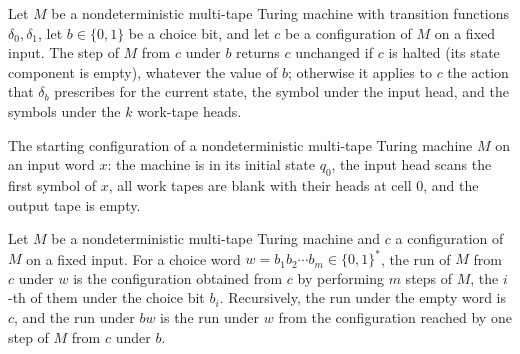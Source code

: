 \begin{definition}
\label{Turing.NDTM.stepWith}
\leanok
{}
Let $M$ be a nondeterministic multi-tape Turing machine with transition functions
$\delta_0, \delta_1$, let $b \in \{0,1\}$ be a choice bit, and let $c$ be a configuration
of $M$ on a fixed input.  The step of $M$ from $c$ under $b$ returns $c$ unchanged if $c$
is halted (its state component is empty), whatever the value of $b$; otherwise it applies
to $c$ the action that $\delta_b$ prescribes for the current state, the symbol under the
input head, and the symbols under the $k$ work-tape heads.
\end{definition}

\begin{definition}
\label{Turing.NDTM.initCfg}
\leanok
{}
The starting configuration of a nondeterministic multi-tape Turing machine $M$ on an input
word $x$: the machine is in its initial state $q_0$, the input head scans the first symbol
of $x$, all work tapes are blank with their heads at cell $0$, and the output tape is
empty.
\end{definition}

\begin{definition}
\label{Turing.NDTM.runWith}
\leanok
{}
Let $M$ be a nondeterministic multi-tape Turing machine and $c$ a configuration of $M$ on a
fixed input.  For a choice word $w = b_1 b_2 \cdots b_m \in \{0,1\}^*$, the run of $M$ from
$c$ under $w$ is the configuration obtained from $c$ by performing $m$ steps of $M$, the
$i$-th of them under the choice bit $b_i$.  Recursively, the run under the empty word is $c$,
and the run under $b w$ is the run under $w$ from the configuration reached by one step
of $M$ from $c$ under $b$.
\end{definition}

